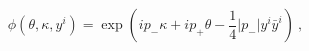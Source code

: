 \begin{equation}
 \phi (\theta, \kappa , y^i) = \exp \left(
   i p_- \kappa  + i p_+ \theta  - \frac{1}{4} |p_-| y^i \bar y^i 
  \right) ~,
\end{equation}

